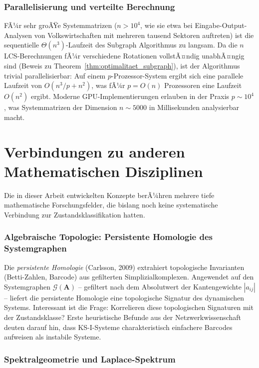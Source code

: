 ﻿\documentclass[12pt, a4paper, titlepage]{report}
\theoremstyle{definition}
\theoremstyle{remark}
\newcommand{\vA}{\bm{A}}
\begin{document}
\subsubsection*{Parallelisierung und verteilte Berechnung}

FÃ¼r sehr groÃŸe Systemmatrizen ($n > 10^4$, wie sie etwa bei Eingabe-Output-Analysen
von Volkswirtschaften mit mehreren tausend Sektoren auftreten) ist die sequentielle
$\Theta(n^3)$-Laufzeit des Subgraph Algorithmus zu langsam. Da die $n$ LCS-Berechnungen
fÃ¼r verschiedene Rotationen vollstÃ¤ndig unabhÃ¤ngig sind (Beweis zu
Theorem~\ref{thm:optimalitaet_subgraph}), ist der Algorithmus trivial parallelisierbar:
Auf einem $p$-Prozessor-System ergibt sich eine parallele Laufzeit von
$O(n^3/p + n^2)$, was fÃ¼r $p = O(n)$ Prozessoren eine Laufzeit $O(n^2)$ ergibt.
Moderne GPU-Implementierungen erlauben in der Praxis $p \sim 10^4$, was
Systemmatrizen der Dimension $n \sim 5000$ in Millisekunden analysierbar macht.

\section{Verbindungen zu anderen Mathematischen Disziplinen}
\label{subsec:math_verbindungen}

Die in dieser Arbeit entwickelten Konzepte berÃ¼hren mehrere tiefe mathematische
Forschungsfelder, die bislang noch keine systematische Verbindung zur Zustandsklassifikation
hatten.

\subsubsection*{Algebraische Topologie: Persistente Homologie des Systemgraphen}

Die \emph{persistente Homologie} (Carlsson, 2009) extrahiert topologische
Invarianten (Betti-Zahlen, Barcode) aus gefilterten Simplizialkomplexen. Angewendet
auf den Systemgraphen $\mathcal{G}(\vA)$ -- gefiltert nach dem Absolutwert der
Kantengewichte $|a_{ij}|$ -- liefert die persistente Homologie eine
topologische Signatur des dynamischen Systems. Interessant ist die Frage: Korrelieren
diese topologischen Signaturen mit der Zustandsklasse? Erste heuristische Befunde
aus der Netzwerkwissenschaft deuten darauf hin, dass KS-I-Systeme charakteristisch
einfachere Barcodes aufweisen als instabile Systeme.

\subsubsection*{Spektralgeometrie und Laplace-Spektrum}
\end{document}
